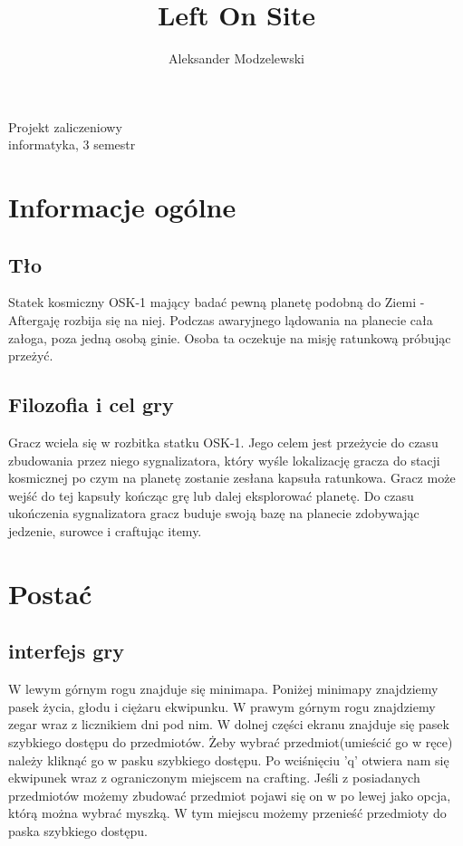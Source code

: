 \documentclass[22pt]{article}
\title{\huge{Left On Site}}
\author{Aleksander Modzelewski}
\begin{document}
\maketitle

\begin{center}
Projekt zaliczeniowy\\
informatyka, 3 semestr
\end{center}
\newpage
\tableofcontents
\newpage

\section{Informacje ogólne}
\subsection{Tło}
Statek kosmiczny OSK-1 mający badać pewną planetę
podobną do Ziemi - Aftergaję rozbija się na niej. Podczas awaryjnego lądowania na planecie cała załoga,
 poza jedną osobą ginie. Osoba ta oczekuje na misję ratunkową próbując przeżyć.
\subsection{Filozofia i cel gry}
Gracz wciela się w rozbitka statku OSK-1. Jego celem jest przeżycie do czasu zbudowania przez niego sygnalizatora, który wyśle lokalizację gracza do stacji kosmicznej po czym na planetę zostanie zesłana kapsuła ratunkowa. Gracz może 
wejść do tej kapsuły kończąc grę lub dalej eksplorować planetę. Do czasu ukończenia sygnalizatora gracz buduje swoją bazę na planecie zdobywając jedzenie, surowce i craftując itemy. 
\section{Postać}
\subsection{interfejs gry}
W lewym górnym rogu znajduje się minimapa. Poniżej minimapy znajdziemy pasek
życia, głodu i ciężaru ekwipunku. W prawym górnym rogu znajdziemy zegar wraz z
licznikiem dni pod nim. W dolnej części ekranu znajduje się pasek szybkiego dostępu do przedmiotów. Żeby wybrać przedmiot(umieścić go w ręce) należy kliknąć go w pasku szybkiego dostępu. Po wciśnięciu 'q' otwiera nam się ekwipunek wraz z 
ograniczonym miejscem na crafting. Jeśli z posiadanych przedmiotów możemy zbudować przedmiot pojawi się on w po lewej jako opcja, którą można wybrać myszką. W tym miejscu możemy przenieść przedmioty do paska szybkiego dostępu. 
\end{document}
